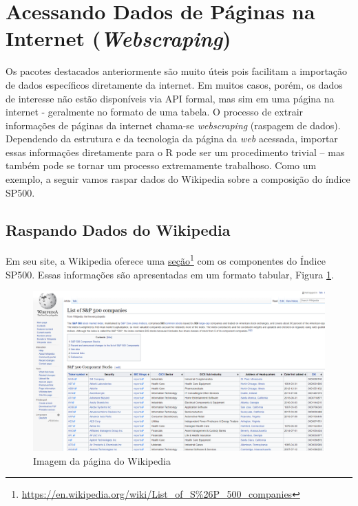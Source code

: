 \documentclass[
  11pt,
]{book}
\begin{document}
\hypertarget{acessando-dados-de-puxe1ginas-na-internet-webscraping}{%
\section{\texorpdfstring{Acessando Dados de Páginas na Internet (\emph{Webscraping})}{Acessando Dados de Páginas na Internet (Webscraping)}}\label{acessando-dados-de-puxe1ginas-na-internet-webscraping}}

Os pacotes destacados anteriormente são muito úteis pois facilitam a importação de dados específicos diretamente da internet. Em muitos casos, porém, os dados de interesse não estão disponíveis via API formal, mas sim em uma página na internet - geralmente no formato de uma tabela. O processo de extrair informações de páginas da internet chama-se \emph{webscraping} (raspagem de dados). Dependendo da estrutura e da tecnologia da página da \emph{web} acessada, importar essas informações diretamente para o R pode ser um procedimento trivial -- mas também pode se tornar um processo extremamente trabalhoso. Como um exemplo, a seguir vamos raspar dados do Wikipedia sobre a composição do índice SP500.

\hypertarget{raspando-dados-do-wikipedia}{%
\subsection{Raspando Dados do Wikipedia}\label{raspando-dados-do-wikipedia}}

Em seu site, a Wikipedia oferece uma \href{https://en.wikipedia.org/wiki/List_of_S\%26P_500_companies}{seção}\footnote{\url{https://en.wikipedia.org/wiki/List_of_S\%26P_500_companies}} com os componentes do Índice SP500. Essas informações são apresentadas em um formato tabular, Figura \ref{fig:SP500-wikipedia}.

\begin{figure}[!htbp]

{\centering \includegraphics[width=0.75\linewidth]{00-text-resources/figs/SP500-Wikipedia} 

}

\caption{Imagem da página do Wikipedia}\label{fig:SP500-wikipedia}
\end{figure}
\end{document}
